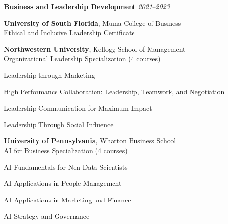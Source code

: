 {\bf Business and Leadership Development} \hfill {\it 2021--2023}
\begin{list1}
\vspace*{.05in}
\item[] {\bf University of South Florida}, Muma College of Business \\
\quad Ethical and Inclusive Leadership Certificate
\vspace{.05in}
\item[] {\bf Northwestern University}, Kellogg School of Management \\
\quad Organizational Leadership Specialization (4 courses)
\begin{list2}
\vspace{.05in}
\item Leadership through Marketing
\item High Performance Collaboration: Leadership, Teamwork, and Negotiation
\item Leadership Communication for Maximum Impact
\item Leadership Through Social Influence
\end{list2}

\vspace*{.05in}
\item[] {\bf University of Pennsylvania}, Wharton Business School \\
\quad AI for Business Specialization (4 courses)
\begin{list2}
\vspace*{.05in}
\item AI Fundamentals for Non-Data Scientists
\item AI Applications in People Management
\item AI Applications in Marketing and Finance
\item AI Strategy and Governance
\end{list2}
\end{list1}

